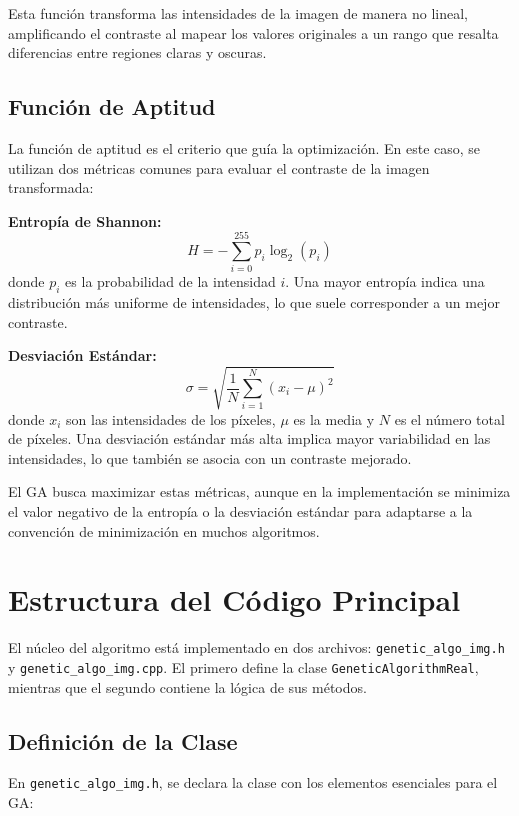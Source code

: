 Esta función transforma las intensidades de la imagen de manera no lineal, amplificando el contraste al mapear los valores originales a un rango que resalta diferencias entre regiones claras y oscuras.

\subsection{Función de Aptitud}
La función de aptitud es el criterio que guía la optimización. En este caso, se utilizan dos métricas comunes para evaluar el contraste de la imagen transformada:

\textbf{Entropía de Shannon:}
\begin{equation}
H = -\sum_{i=0}^{255} p_i \log_2(p_i)
\end{equation}
donde \(p_i\) es la probabilidad de la intensidad \(i\). Una mayor entropía indica una distribución más uniforme de intensidades, lo que suele corresponder a un mejor contraste.

\textbf{Desviación Estándar:}
\begin{equation}
\sigma = \sqrt{\frac{1}{N} \sum_{i=1}^{N} (x_i - \mu)^2}
\end{equation}
donde \(x_i\) son las intensidades de los píxeles, \(\mu\) es la media y \(N\) es el número total de píxeles. Una desviación estándar más alta implica mayor variabilidad en las intensidades, lo que también se asocia con un contraste mejorado.

El GA busca maximizar estas métricas, aunque en la implementación se minimiza el valor negativo de la entropía o la desviación estándar para adaptarse a la convención de minimización en muchos algoritmos.

\section{Estructura del Código Principal}
\label{sec:estructura_codigo}

El núcleo del algoritmo está implementado en dos archivos: \texttt{genetic\_algo\_img.h} y \texttt{genetic\_algo\_img.cpp}. El primero define la clase \texttt{GeneticAlgorithmReal}, mientras que el segundo contiene la lógica de sus métodos.

\subsection{Definición de la Clase}
\label{subsec:definicion_clase}

En \texttt{genetic_algo_img.h}, se declara la clase con los elementos esenciales para el GA:


